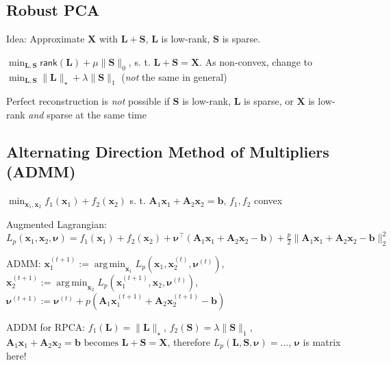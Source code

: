 \documentclass[a4paper, 11pt, landscape]{article}
\DeclareMathOperator*{\argmin}{arg\,min}
\begin{document}
\begin{multicols*}{3}
\section{Robust PCA}
\begin{compactitem}
	\item Idea: Approximate $\mathbf{X}$ with $\mathbf{L} + \mathbf{S}$, $\mathbf{L}$ is low-rank, $\mathbf{S}$ is sparse.
	\item $\min_{\mathbf{L},\mathbf{S}}\mathsf{rank}(\mathbf{L}) + \mu \lVert \mathbf{S}\rVert_0$, s. t. $\mathbf{L} + \mathbf{S} = \mathbf{X}$. As non-convex, change to $\min_{\mathbf{L},\mathbf{S}} \|\mathbf{L}\|_\star + \lambda \lVert\mathbf{S}\rVert_1$ (\emph{not} the same in general)
	\item Perfect reconstruction is \emph{not} possible if $\mathbf{S}$ is low-rank, $\mathbf{L}$ is sparse, or $\mathbf{X}$ is low-rank \textit{and} sparse at the same time
\end{compactitem}

\subsection{Alternating Direction Method of Multipliers (ADMM)}
$\min_{\mathbf{x}_1, \mathbf{x}_2} f_1(\mathbf{x}_1) + f_2(\mathbf{x}_2)$ s. t. $\mathbf{A}_1 \mathbf{x}_1 + \mathbf{A}_2 \mathbf{x}_2 = \mathbf{b}$, $f_1, f_2$ convex
\begin{inparaitem}[\color{red}\textbullet]
	\item Augmented Lagrangian: $L_p(\mathbf{x}_1, \mathbf{x}_2, \boldsymbol{\nu}) = f_1(\mathbf{x}_1) + f_2(\mathbf{x}_2) + \boldsymbol{\nu}^\top (\mathbf{A}_1 \mathbf{x}_1 + \mathbf{A}_2 \mathbf{x}_2 - \mathbf{b}) + \frac{p}{2}\| \mathbf{A}_1 \mathbf{x}_1 + \mathbf{A}_2 \mathbf{x}_2 - \mathbf{b} \|_2^2$
	\item ADMM: $\mathbf{x}_1^{(t+1)} := \argmin_{\mathbf{x}_1} L_p(\mathbf{x}_1, \mathbf{x}_2^{(t)}, \boldsymbol{\nu}^{(t)})$, $\mathbf{x}_2^{(t+1)} := \argmin_{\mathbf{x}_2} L_p(\mathbf{x}_1^{(t+1)}, \mathbf{x}_2, \boldsymbol{\nu}^{(t)})$, $\boldsymbol{\nu}^{(t+1)} := \boldsymbol{\nu}^{(t)} + p(\mathbf{A}_1 \mathbf{x}_1^{(t+1)} + \mathbf{A}_2 \mathbf{x}_2^{(t+1)} - \mathbf{b})$
	\item ADDM for RPCA: $f_1(\mathbf{L}) = \|\mathbf{L}\|_\star$, $f_2(\mathbf{S}) = \lambda \| \mathbf{S} \|_1$, $\mathbf{A}_1 \mathbf{x}_1 + \mathbf{A}_2 \mathbf{x}_2 = \mathbf{b} \text{ becomes } \mathbf{L} + \mathbf{S} = \mathbf{X}$, therefore $L_p(\mathbf{L}, \mathbf{S}, \boldsymbol{\nu}) = \ldots$, $\boldsymbol{\nu}$ is matrix here!
\end{inparaitem}




\raggedcolumns
\end{multicols*}
\end{document}
